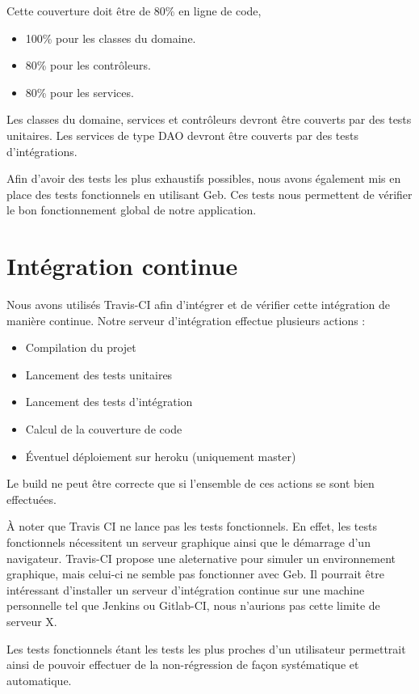 \documentclass[12pt,a4paper,oneside]{book}
\begin{document}
	Cette couverture doit être de 80\% en ligne de code, 
	\begin{itemize}
		\item 100\% pour les classes du domaine.
		\item 80\% pour les contrôleurs.
		\item 80\% pour les services.
	\end{itemize}	
	
	Les classes du domaine, services et contrôleurs devront être couverts par des tests unitaires. Les services de type DAO devront être couverts par des tests d'intégrations.
	
	Afin d’avoir des tests les plus exhaustifs possibles, nous avons également mis en place des tests fonctionnels en utilisant Geb. Ces tests nous permettent de vérifier le bon fonctionnement global de notre application.
	
	\section{Intégration continue}
	Nous avons utilisés Travis-CI afin d’intégrer et de vérifier cette intégration de manière continue. Notre serveur d’intégration effectue plusieurs actions : 
	\begin{itemize}
		\item Compilation du projet 
		\item Lancement des tests unitaires
		\item Lancement des tests d’intégration
		\item Calcul de la couverture de code
		\item Éventuel déploiement sur heroku (uniquement master)
	\end{itemize}
	Le build ne peut être correcte que si l'ensemble de ces actions se sont bien effectuées. 

	\begin{exemple}
	À noter que Travis CI ne lance pas les tests fonctionnels. En effet, les tests fonctionnels nécessitent un serveur graphique
	ainsi que le démarrage d’un navigateur. Travis-CI propose une aleternative pour simuler un environnement graphique, mais
	celui-ci ne semble pas fonctionner avec Geb. Il pourrait être intéressant d'installer un serveur d’intégration continue sur une
	machine personnelle tel que Jenkins ou Gitlab-CI, nous n'aurions pas cette limite de serveur X.
	\end{exemple}

	Les tests fonctionnels étant les tests les plus proches d’un utilisateur permettrait ainsi de pouvoir effectuer de la non-régression de façon systématique et automatique.
	
\end{document}
